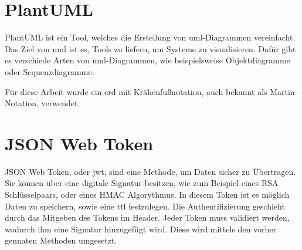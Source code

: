 \section{PlantUML}
PlantUML ist ein Tool, welches die Erstellung von \gls{uml}-Diagrammen vereinfacht. 
Das Ziel von \gls{uml} ist es, Tools zu liefern, um Systeme zu visualisieren.
\cite{UMLPaper}
Dafür gibt es verschiede Arten von \gls{uml}-Diagrammen, wie beispielsweise Objektdiagramme oder Sequenzdiagramme.
\cite{PlantUML}


Für diese Arbeit wurde ein \gls{erd} mit Krähenfußnotation, auch bekannt als Martin-Notation, verwendet.

\section{JSON Web Token}
JSON Web Token, oder \gls{jwt}, sind eine Methode, um Daten sicher zu Übertragen. 
Sie können über eine digitale Signatur besitzen, wie zum Beispiel eines RSA Schlüsselpaars, oder eines HMAC Algorythmus. 
In diesem Token ist es möglich Daten zu speichern, sowie eine \gls{ttl} festzulegen. 
Die Authentifizierung geschieht durch das Mitgeben des Tokens im Header. 
Jeder Token muss validiert werden, wodurch ihm eine Signatur hinzugefügt wird. 
Diese wird mittels den vorher gennaten Methoden umgesetzt. 
\cite{JWTAbout}


